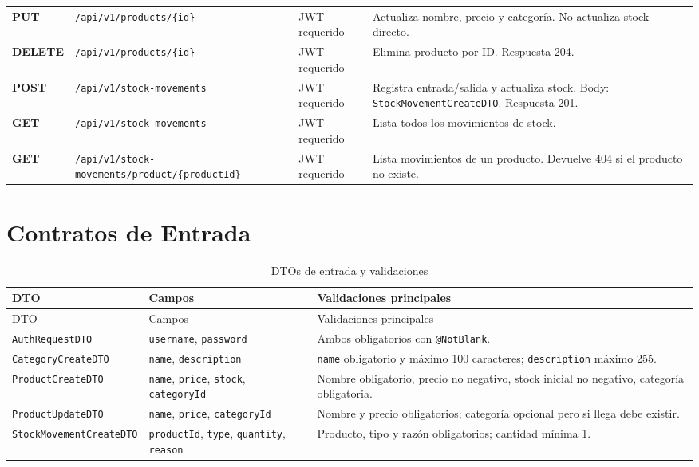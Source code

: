 \documentclass[11pt,oneside]{report}
\newcommand{\GET}{\textcolor{methodGet}{\textbf{GET}}}
\newcommand{\POST}{\textcolor{methodPost}{\textbf{POST}}}
\newcommand{\PUT}{\textcolor{methodPut}{\textbf{PUT}}}
\newcommand{\DELETE}{\textcolor{methodDelete}{\textbf{DELETE}}}
\newcommand{\pathcode}[1]{{\ttfamily\scriptsize\nolinkurl{#1}}}
\begin{document}
\begin{longtable}{p{1.6cm} p{5.2cm} p{2.6cm} p{5.9cm}}
\PUT & \pathcode{/api/v1/products/{id}} & JWT requerido & Actualiza nombre, precio y categoría. No actualiza stock directo.\\
\DELETE & \pathcode{/api/v1/products/{id}} & JWT requerido & Elimina producto por ID. Respuesta 204.\\
\POST & \pathcode{/api/v1/stock-movements} & JWT requerido & Registra entrada/salida y actualiza stock. Body: \texttt{StockMovementCreateDTO}. Respuesta 201.\\
\GET & \pathcode{/api/v1/stock-movements} & JWT requerido & Lista todos los movimientos de stock.\\
\GET & \pathcode{/api/v1/stock-movements/product/{productId}} & JWT requerido & Lista movimientos de un producto. Devuelve 404 si el producto no existe.\\
\bottomrule
\end{longtable}

\section{Contratos de Entrada}

\begin{longtable}{p{3.5cm} p{5.0cm} p{6.2cm}}
\caption{DTOs de entrada y validaciones}\\
\toprule
DTO & Campos & Validaciones principales \\
\midrule
\endfirsthead
\toprule
DTO & Campos & Validaciones principales \\
\midrule
\endhead
\texttt{AuthRequestDTO} & \texttt{username}, \texttt{password} & Ambos obligatorios con \texttt{@NotBlank}.\\
\texttt{CategoryCreateDTO} & \texttt{name}, \texttt{description} & \texttt{name} obligatorio y máximo 100 caracteres; \texttt{description} máximo 255.\\
\texttt{ProductCreateDTO} & \texttt{name}, \texttt{price}, \texttt{stock}, \texttt{categoryId} & Nombre obligatorio, precio no negativo, stock inicial no negativo, categoría obligatoria.\\
\texttt{ProductUpdateDTO} & \texttt{name}, \texttt{price}, \texttt{categoryId} & Nombre y precio obligatorios; categoría opcional pero si llega debe existir.\\
\texttt{StockMovementCreateDTO} & \texttt{productId}, \texttt{type}, \texttt{quantity}, \texttt{reason} & Producto, tipo y razón obligatorios; cantidad mínima 1.\\
\bottomrule
\end{longtable}
\end{document}
